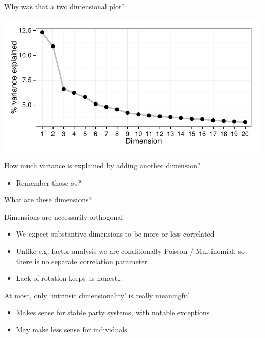 \documentclass{hertieteaching}
\begin{document}
\begin{frame}{Why was that a two dimensional plot?}

\bigskip
\centerline{\includegraphics[scale=0.7]{pictures/demanif-allvarexpl}}

How much variance is explained by adding another dimension?
\begin{itemize}
  \item Remember those $\sigma$s?
\end{itemize}

\end{frame}

\begin{frame}{What are these dimensions?}

Dimensions are necessarily orthogonal
\begin{itemize}
  \item We expect substantive dimensions to be more or less correlated
  \item Unlike e.g. factor analysis we are conditionally Poisson / Multinomial, so there is no separate correlation parameter
  \item Lack of rotation keeps us honest\ldots
\end{itemize}

At most, only `intrinsic dimensionality' is really meaningful
\begin{itemize}
  \item Makes sense for stable party systems, with notable exceptions
  \item May make less sense for individuals \parencite{Broockman2016}
\end{itemize}

\end{frame}
\end{document}
